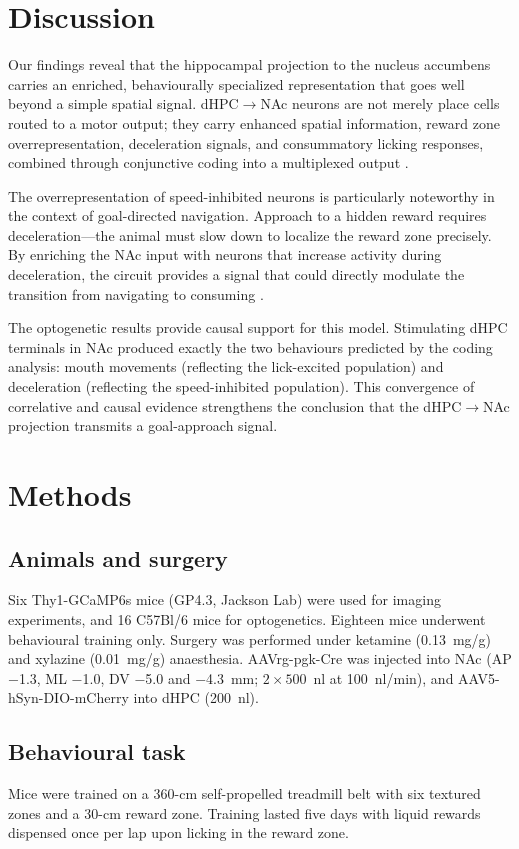 \documentclass[11pt]{article}
\begin{document}
\section{Discussion}

Our findings reveal that the hippocampal projection to the nucleus accumbens carries an enriched, behaviourally specialized representation that goes well beyond a simple spatial signal. dHPC$\to$NAc neurons are not merely place cells routed to a motor output; they carry enhanced spatial information, reward zone overrepresentation, deceleration signals, and consummatory licking responses, combined through conjunctive coding into a multiplexed output \citep{wikenheiser2016hippocampal}.

The overrepresentation of speed-inhibited neurons is particularly noteworthy in the context of goal-directed navigation. Approach to a hidden reward requires deceleration---the animal must slow down to localize the reward zone precisely. By enriching the NAc input with neurons that increase activity during deceleration, the circuit provides a signal that could directly modulate the transition from navigating to consuming \citep{floresco2015nucleus}.

The optogenetic results provide causal support for this model. Stimulating dHPC terminals in NAc produced exactly the two behaviours predicted by the coding analysis: mouth movements (reflecting the lick-excited population) and deceleration (reflecting the speed-inhibited population). This convergence of correlative and causal evidence strengthens the conclusion that the dHPC$\to$NAc projection transmits a goal-approach signal.

\section{Methods}

\subsection{Animals and surgery}
Six Thy1-GCaMP6s mice (GP4.3, Jackson Lab) were used for imaging experiments, and 16 C57Bl/6 mice for optogenetics. Eighteen mice underwent behavioural training only. Surgery was performed under ketamine (0.13~mg/g) and xylazine (0.01~mg/g) anaesthesia. AAVrg-pgk-Cre was injected into NAc (AP $-$1.3, ML $-$1.0, DV $-$5.0 and $-$4.3~mm; $2 \times 500$~nl at 100~nl/min), and AAV5-hSyn-DIO-mCherry into dHPC (200~nl).

\subsection{Behavioural task}
Mice were trained on a 360-cm self-propelled treadmill belt with six textured zones and a 30-cm reward zone. Training lasted five days with liquid rewards dispensed once per lap upon licking in the reward zone.
\end{document}
